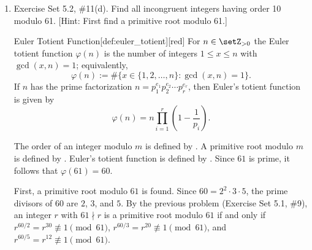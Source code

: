 \begin{enumerate}
\begin{subprove}
    ($\Leftarrow$) Suppose $r^{(p-1)/q} \not\equiv 1 \pmod{p}$ for all prime divisors $q$ of $p-1$ for the sake of direct proof.
    It is shown that $r$ is a primitive root modulo $p$, i.e., $\operatorname{ord}_p(r) = p-1$.
    Let $d = \operatorname{ord}_p(r)$. By , $d$ divides $p-1$.
    Suppose, for the sake of contradiction, that $d < p-1$.
    Then $p-1 = d \cdot k$ for some integer $k > 1$.
    Since $k > 1$, there exists a prime divisor $q$ of $k$, and hence $q$ is also a prime divisor of $p-1$.
    Since $q \mid k$ and $p-1 = d \cdot k$, it follows that $d \mid (p-1)/q$.
    Therefore, $(p-1)/q = d \cdot \ell$ for some positive integer $\ell$.
    Since $r^d \equiv 1 \pmod{p}$ by , it follows that
    \[
    r^{(p-1)/q} = r^{d \cdot \ell} = (r^d)^\ell \equiv 1^\ell \equiv 1 \pmod{p},
    \]
    which contradicts the assumption that $r^{(p-1)/q} \not\equiv 1 \pmod{p}$ for all prime divisors $q$ of $p-1$.
    Therefore, $d = p-1$, so $\operatorname{ord}_p(r) = p-1 = \varphi(p)$.
    Hence, by , $r$ is a primitive root modulo $p$.
    
    Therefore, by ($\Rightarrow$) and ($\Leftarrow$), $r$ is a primitive root modulo $p$ if and only if $r^{(p-1)/q} \not\equiv 1 \pmod{p}$ for all prime divisors $q$ of $p-1$.
  \end{subprove}

  \item Exercise Set 5.2, \#11(d). Find all incongruent integers having order 10 modulo 61. 
  [Hint: First find a primitive root modulo 61.]
  \begin{define}{Euler Totient Function}[def:euler_totient][red]
    For $n\in\setZ_{>0}$ the Euler totient function $\varphi(n)$ is the number of integers
    $1\le x\le n$ with $\gcd(x,n)=1$; equivalently,
    \[
    \varphi(n):=\#\{x\in\{1,2,\dots,n\}:\gcd(x,n)=1\}.
    \]
    If $n$ has the prime factorization $n = p_1^{e_1} p_2^{e_2} \cdots p_r^{e_r}$, then Euler's totient function is given by
    \[
    \varphi(n) = n \prod_{i=1}^{r} \left(1 - \frac{1}{p_i}\right).
    \]
  \end{define}  
  \begin{subanswer}
    The order of an integer modulo $m$ is defined by .
    A primitive root modulo $m$ is defined by .
    Euler's totient function is defined by .
    Since $61$ is prime, it follows that $\varphi(61) = 60$.
    
    First, a primitive root modulo $61$ is found. Since $60 = 2^2 \cdot 3 \cdot 5$, the prime divisors of $60$ are $2$, $3$, and $5$.
    By the previous problem (Exercise Set 5.1, \#9), an integer $r$ with $61 \nmid r$ is a primitive root modulo $61$ if and only if $r^{60/2} = r^{30} \not\equiv 1 \pmod{61}$, $r^{60/3} = r^{20} \not\equiv 1 \pmod{61}$, and $r^{60/5} = r^{12} \not\equiv 1 \pmod{61}$.
    

\end{subanswer}
\end{enumerate}
